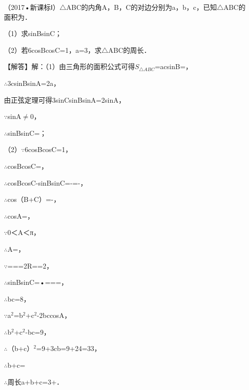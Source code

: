 \begin{question}
（2017•新课标Ⅰ）$\triangle$ABC的内角A，B，C的对边分别为a，b，c，已知$\triangle$ABC的面积为\allowbreak{}．\par
（1）求sinBsinC；\par
（2）若6cosBcosC=1，a=3，求$\triangle$ABC的周长．\par
\begin{solution}
【解答】解：（1）由三角形的面积公式可得$S_{\triangle ABC}$=\allowbreak{}acsinB=\allowbreak{}，\par
$\therefore$3csinBsinA=2a，\par
由正弦定理可得3sinCsinBsinA=2sinA，\par
$\because$sinA$\neq$0，\par
$\therefore$sinBsinC=\allowbreak{}；\par
（2）$\because$6cosBcosC=1，\par
$\therefore$cosBcosC=\allowbreak{}，\par
$\therefore$cosBcosC-sinBsinC=\allowbreak{}-\allowbreak{}=-\allowbreak{}，\par
$\therefore$cos（B+C）=-\allowbreak{}，\par
$\therefore$cosA=\allowbreak{}，\par
$\because$0＜A＜π，\par
$\therefore$A=\allowbreak{}，\par
$\because$\allowbreak{}=\allowbreak{}=\allowbreak{}=2R=\allowbreak{}=2\allowbreak{}，\par
$\therefore$sinBsinC=\allowbreak{}•\allowbreak{}=\allowbreak{}=\allowbreak{}=\allowbreak{}，\par
$\therefore$bc=8，\par
$\because$a$^{2}$=b$^{2}$+c$^{2}$-2bccosA，\par
$\therefore$b$^{2}$+c$^{2}$-bc=9，\par
$\therefore$（b+c）$^{2}$=9+3cb=9+24=33，\par
$\therefore$b+c=\allowbreak{}\par
$\therefore$周长a+b+c=3+\allowbreak{}．\par
\end{solution}
\end{question}

